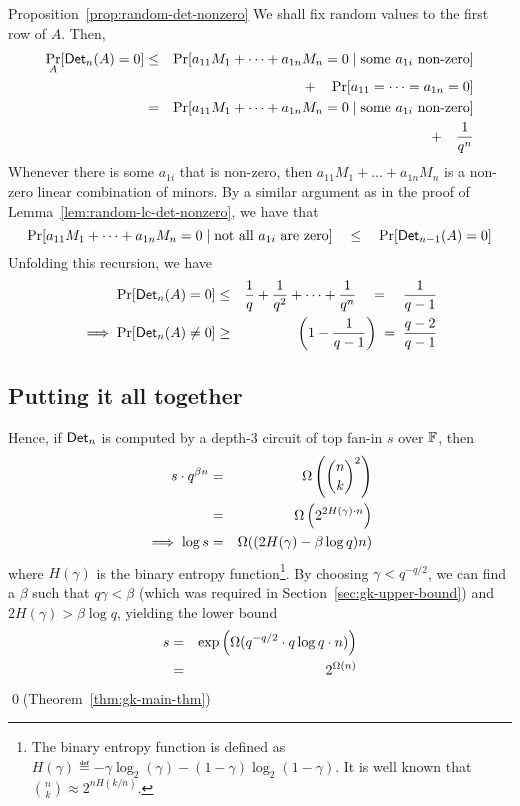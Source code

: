 \documentclass{birkjour}
\begin{document}
\begin{proofof}{Proposition~\ref{prop:random-det-nonzero}}
We shall fix random values to the first row of $A$. Then,
\begin{eqnarray*}
\Pr_{A}[\mathsf{Det}_n(A) = 0] & \leq & \Pr[a_{11} M_1 + \dots + a_{1n} M_n = 0 \;|\;\text{some $a_{1i}$ non-zero}]\\
& &\quad + \quad \Pr[a_{11}=\dots = a_{1n} = 0]\\
 & = & \Pr[a_{11} M_1 + \dots + a_{1n} M_n = 0 \;|\;\text{some $a_{1i}$ non-zero}]\\
 & & \quad + \quad \frac{1}{q^n}
\end{eqnarray*}
Whenever there is some $a_{1i}$ that is non-zero, then $a_{11}M_1 +
\dots + a_{1n}M_n$ is a non-zero linear combination of minors. By a similar argument as in the proof of Lemma~\ref{lem:random-lc-det-nonzero}, we have that
$$
\Pr[a_{11} M_1 + \dots + a_{1n}M_n = 0\;|\;\text{not all $a_{1i}$ are zero}] \quad \leq \quad \Pr[\mathsf{Det}_{n-1}(A) = 0]
$$
Unfolding this recursion, we have
\begin{eqnarray*}
\Pr[\mathsf{Det}_n(A) = 0] & \leq & \frac{1}{q} + \frac{1}{q^2} + \dots + \frac{1}{q^n} \quad=\quad \frac{1}{q-1}\\
\implies \Pr[\mathsf{Det}_n(A) \neq 0] & \geq & \left(1 - \frac{1}{q-1}\right) \;=\; \frac{q-2}{q-1} 
\end{eqnarray*}
\end{proofof}



\subsection{Putting it all together}

Hence, if $\mathsf{Det}_n$ is computed by a depth-3 circuit of top fan-in $s$ over $\mathbb{F}$, then 
\begin{eqnarray*}
s \cdot q^{\beta n} & = &  \Omega\left(\binom{n}{k}^2\right)\\
 & = & \Omega\left(2^{2H(\gamma)\cdot n}\right)\\
\implies \log s & = & \Omega((2H(\gamma) - \beta \log q)n)
\end{eqnarray*}
where $H(\gamma)$ is the binary entropy function\footnote{The binary entropy function is defined as $H(\gamma) \eqdef -\gamma \log_2(\gamma) - (1-\gamma)\log_2(1-\gamma)$. It is well known that $\binom{n}{k} \approx 2^{nH(k/n)}$. }. 
By choosing $\gamma < q^{-q/2}$, we can find a $\beta$ such that
$q\gamma < \beta$ (which was required in
Section~\ref{sec:gk-upper-bound}) and $2H(\gamma) > \beta \log q$,
yielding the lower bound  
\begin{eqnarray*}
  s &=& \exp\left(\Omega(q^{-q/2}\cdot q\log q \cdot n)\right) \\
  & =& 2^{\Omega(n)}
\end{eqnarray*}
\qed (Theorem~\ref{thm:gk-main-thm})
\end{document}
